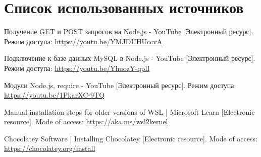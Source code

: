 \newpage

\begingroup
  \section*{Список использованных источников}

  \renewcommand{\addcontentsline}[3]{}%
  \renewcommand{\section}[2]{}%

  \begin{thebibliography}{}
    Получение GET и POST запросов на Node.js - YouTube
    [Электронный ресурс].
    Режим доступа: \url{https://youtu.be/YMJDUHUccvA}

    Подключение к базе данных MySQL в Node.js - YouTube
    [Электронный ресурс].
    Режим доступа: \url{https://youtu.be/YhuozY-qplI}

    Модули Node.js, require - YouTube
    [Электронный ресурс].
    Режим доступа: \url{https://youtu.be/1PkarXC-9TQ}

    Manual installation steps for older versions of WSL | Microsoft Learn
    [Electronic resource].
    Mode of access: \url{https://aka.ms/wsl2kernel}

    Chocolatey Software | Installing Chocolatey
    [Electronic resource].
    Mode of access: \url{https://chocolatey.org/install}
  \end{thebibliography}
\endgroup

\newpage

